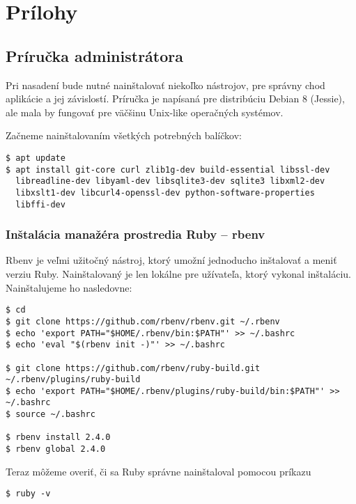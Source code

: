 \chapter*{Prílohy}

\section*{Príručka administrátora}

Pri nasadení bude nutné nainštalovať niekoľko nástrojov, pre správny chod aplikácie a jej závislostí. Príručka je napísaná pre distribúciu Debian 8 (Jessie), ale mala by fungovať pre väčšinu Unix-like operačných systémov.

Začneme nainštalovaním všetkých potrebných balíčkov:

\begin{verbatim}
$ apt update
$ apt install git-core curl zlib1g-dev build-essential libssl-dev 
  libreadline-dev libyaml-dev libsqlite3-dev sqlite3 libxml2-dev 
  libxslt1-dev libcurl4-openssl-dev python-software-properties 
  libffi-dev

\end{verbatim}

\clearpage
\subsection*{Inštalácia manažéra prostredia Ruby -- rbenv}

Rbenv je veľmi užitočný nástroj, ktorý umožní jednoducho inštalovať a meniť verziu Ruby. Nainštalovaný je len lokálne pre užívateľa, ktorý vykonal inštaláciu. Nainštalujeme ho nasledovne:

\begin{verbatim}
$ cd
$ git clone https://github.com/rbenv/rbenv.git ~/.rbenv
$ echo 'export PATH="$HOME/.rbenv/bin:$PATH"' >> ~/.bashrc
$ echo 'eval "$(rbenv init -)"' >> ~/.bashrc

$ git clone https://github.com/rbenv/ruby-build.git ~/.rbenv/plugins/ruby-build
$ echo 'export PATH="$HOME/.rbenv/plugins/ruby-build/bin:$PATH"' >> ~/.bashrc
$ source ~/.bashrc

$ rbenv install 2.4.0
$ rbenv global 2.4.0
\end{verbatim}

Teraz môžeme overiť, či sa Ruby správne nainštaloval pomocou príkazu

\begin{verbatim}
$ ruby -v
\end{verbatim}

